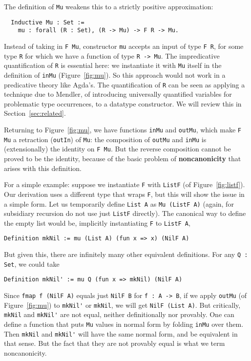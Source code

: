 \documentclass[a4paper,USenglish]{lipics-v2021}
\begin{document}
The definition of \verb|Mu| weakens
this to a strictly positive approximation:
\begin{verbatim}
  Inductive Mu : Set := 
    mu : forall (R : Set), (R -> Mu) -> F R -> Mu.
\end{verbatim}
\noindent Instead of taking in \verb|F Mu|, constructor \verb|mu|
accepts an input of type \verb|F R|, for some type \verb|R| for which
we have a function of type \verb|R -> Mu|.  The impredicative
quantification of \verb|R| is essential here: we instantiate it with
\verb|Mu| itself in the definition of \verb|inMu|
(Figure~\ref{fig:mu}).  So this approach would not work in a
predicative theory like Agda's.  The quantification of \verb|R| can be
seen as applying a technique due to Mendler, of introducing
universally quantified variables for problematic type occurrences, to
a datatype constructor.  We will review this in
Section~\ref{sec:related}.

Returning to Figure~\ref{fig:mu}, we have functions \verb|inMu| and
\verb|outMu|, which make \verb|F Mu| a retraction (\verb|outIn|) of
\verb|Mu|: the composition of \verb|outMu| and \verb|inMu| is
(extensionally) the identity on \verb|F Mu|.  But the reverse
composition cannot be proved to be the identity, because of the basic
problem of \textbf{noncanonicity} that arises with this definition.

For a simple example: suppose we instantiate \verb|F| with
\verb|ListF| (of Figure~\ref{fig:listf}).  Our derivation uses a
different type that wraps \verb|F|, but this will show the issue in a
simple form.  Let us temporarily define \verb|List A| as
\verb|Mu (ListF A)| (again, for subsidiary recursion do not use just
\verb|ListF| directly).  The canonical way to define the empty list
would be, implicitly instantiating \verb|F| to \verb|ListF A|,
\begin{verbatim}
Definition mkNil := mu (List A) (fun x => x) (NilF A)
\end{verbatim}
\noindent But given this, there are infinitely many other equivalent
definitions.  For any \verb|Q : Set|, we could take
\begin{verbatim}
Definition mkNil' := mu Q (fun x => mkNil) (NilF A)
\end{verbatim}
\noindent Since \verb|fmap f (NilF A)| equals just \verb|NilF B| for
\verb|f : A -> B|, if we apply \verb|outMu| (of Figure~\ref{fig:mu})
to \verb|mkNil'| or \verb|mkNil|, we will get \verb|NilF (List A)|.
But critically, \verb|mkNil| and \verb|mkNil'| are not equal, neither
definitionally nor provably.  One can define a function that puts
\verb|Mu| values in normal form by folding \verb|inMu| over them.
Then \verb|mkNil| and \verb|mkNil'| will have the same normal form,
and be equivalent in that sense.  But the fact that they are not
provably equal is what we term noncanonicity.  
\end{document}
